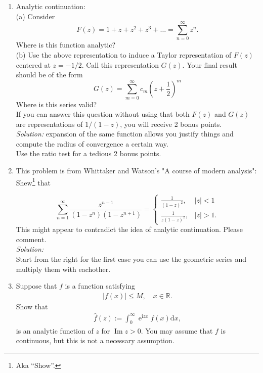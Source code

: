 \documentclass[10pt]{amsart}
\newcommand{\D}{\mathrm{d}}
\newcommand{\I}{\mathrm{i}}
\DeclareMathOperator{\E}{e}
\DeclareMathOperator{\imag}{Im}
\theoremstyle{nonumberplain}
\begin{document}
\begin{enumerate}[label={\bf {\arabic*}:}]
\item Analytic continuation: \\
(a) Consider
$$
F(z)=1+z+z^2+z^3+\ldots=\sum_{n=0}^{\infty} z^n .
$$
Where is this function analytic? \\
(b) Use the above representation to induce a Taylor representation of $F(z)$ centered at $z=-1 / 2$. Call this representation $G(z)$. Your final result should be of the form
$$
G(z)=\sum_{m=0}^{\infty} c_m\left(z+\frac{1}{2}\right)^m
$$
Where is this series valid? \\
If you can answer this question without
using that both $F(z)$ and $G(z)$ are representations of $1 /(1-z)$,
you will receive 2 bonus points.\\
\textit{Solution:}
expansion of the same function allows you justify things and compute the radius of convergence a certain way. \\

\noindent
Use the ratio test for a tedious 2 bonus points.

\newpage

\item This problem is from Whittaker and Watson's "A course of modern
  analysis": Shew\footnote{Aka ``Show''.} that

$$
\sum_{n=1}^{\infty} \frac{z^{n-1}}{\left(1-z^n\right)\left(1-z^{n+1}\right)}= \begin{cases}\frac{1}{(1-z)^2}, & |z|<1 \\ \frac{1}{z(1-z)^2}, & |z|>1 .\end{cases}
$$
This might appear to contradict the idea of analytic
continuation. Please comment.\\
\textit{Solution:} \\
Start from the right for the first case you can use the geometric series and multiply them with eachother.
\newpage

\item Suppose that $f$ is a function satisfying
  \begin{align*}
    |f(x)| \leq M, \quad x \in \mathbb R.
  \end{align*}
  Show that
  \begin{align*}
    \hat f(z) := \int_0^\infty \E^{\I z x} f(x) \D x,
  \end{align*}
  is an analytic function of $z$ for $\imag z > 0$.  You may assume
  that $f$ is continuous, but this is not a necessary assumption.\\
\newpage


\end{enumerate}
\end{document}
